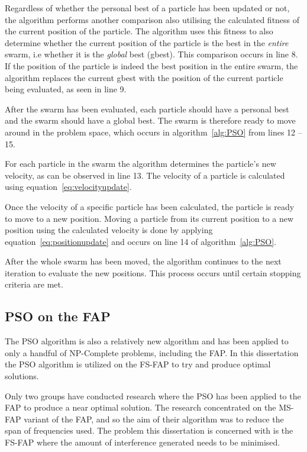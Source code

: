 Regardless of whether the personal best of a particle has been updated or not, the algorithm performs another comparison also utilising the calculated fitness of the current position of the particle. The algorithm uses this fitness to also determine whether the current position of the particle is the best in the \emph{entire} swarm, i.e whether it is  the \emph{global} best (gbest). This comparison occurs in line  8.
If the position of the particle is indeed the best position in the entire swarm, the algorithm replaces the current gbest with the position of the current particle being evaluated, as seen in line 9.

After the swarm has been evaluated, each particle should have a personal best and the swarm should have a global best. The swarm is therefore ready to move around in the problem space, which occurs in algorithm~\ref{alg:PSO} from lines 12 -- 15.

For each particle in the swarm the algorithm determines the particle's new velocity, as can be observed in line 13. The velocity of a particle is calculated using equation~\ref{eq:velocityupdate}. 

Once the velocity of a specific particle has been calculated, the particle is ready to move to a new position. Moving a particle from its current position to a new position using the calculated velocity is done by applying equation~\ref{eq:positionupdate} and occurs on line 14 of algorithm~\ref{alg:PSO}.

After the whole swarm has been moved, the algorithm continues to the next iteration to evaluate the new positions. This process occurs until certain stopping criteria are met.


\subsection{PSO on the \gls{FAP}}
\label{sec:psoonfap}
The \gls{PSO} algorithm is also a relatively new algorithm and has been applied to only a handful of NP-Complete problems, including the \gls{FAP}. In this dissertation the \gls{PSO} algorithm is utilized on the \gls{FS-FAP} to try and produce optimal solutions. 

Only two groups have conducted research where the \gls{PSO} has been applied to the \gls{FAP} to produce a near optimal solution. The research concentrated on the \gls{MS-FAP} variant of the \gls{FAP}, and so the aim of their algorithm was to reduce the span of frequencies used. The problem this dissertation is concerned with is the \gls{FS-FAP} where the amount of interference generated needs to be minimised. 

